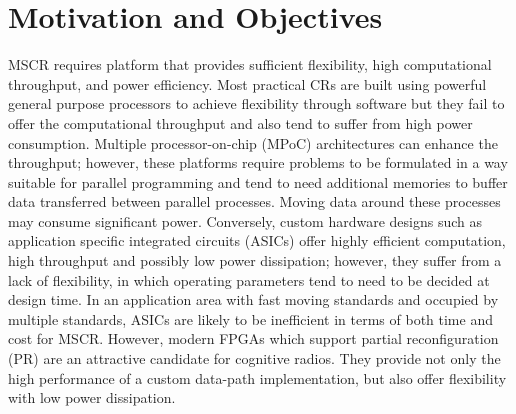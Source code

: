 \section{Motivation and Objectives}

MSCR requires platform that provides sufficient flexibility, high computational throughput, and power efficiency.
Most practical CRs are built using powerful general purpose processors to achieve flexibility through software but they fail to offer the computational throughput and also tend to suffer from high power consumption.
Multiple processor-on-chip (MPoC) architectures can enhance the throughput;
however, these platforms require problems to be formulated in a way suitable for parallel programming and tend to need additional memories to buffer data transferred between parallel processes.
Moving data around these processes may consume significant power.
Conversely, custom hardware designs such as application specific integrated circuits (ASICs) offer highly efficient computation, high throughput and possibly low power dissipation; however, they suffer from a lack of flexibility, in which operating parameters tend to need to be decided at design time.
In an application area with fast moving standards and occupied by multiple standards, ASICs are likely to be inefficient in terms of both time and cost for MSCR.
However, modern FPGAs which support partial reconfiguration (PR) are an attractive candidate for cognitive radios.
They provide not only the high performance of a custom data-path implementation, but also offer flexibility with low power dissipation.

